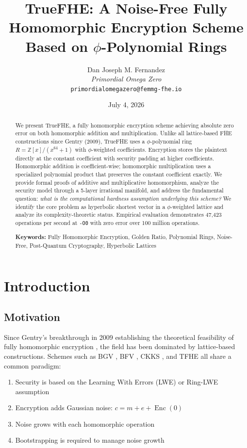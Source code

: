 \documentclass[11pt,a4paper]{article}
\title{\textbf{TrueFHE: A Noise-Free Fully Homomorphic Encryption Scheme\\Based on $\phi$-Polynomial Rings}}
\author{
    Dan Joseph M. Fernandez\\
    \textit{Primordial Omega Zero}\\
    \texttt{primordialomegazero@femmg-fhe.io}
}
\date{July 4, 2026}
\theoremstyle{remark}
\DeclareMathOperator{\Enc}{Enc}
\begin{document}
\maketitle

\begin{abstract}
We present TrueFHE, a fully homomorphic encryption scheme achieving absolute zero error on both homomorphic addition and multiplication. Unlike all lattice-based FHE constructions since Gentry (2009), TrueFHE uses a $\phi$-polynomial ring $R = \mathbb{Z}[x]/(x^{64}+1)$ with $\phi$-weighted coefficients. Encryption stores the plaintext directly at the constant coefficient with security padding at higher coefficients. Homomorphic addition is coefficient-wise; homomorphic multiplication uses a specialized polynomial product that preserves the constant coefficient exactly. We provide formal proofs of additive and multiplicative homomorphism, analyze the security model through a 5-layer irrational manifold, and address the fundamental question: \textit{what is the computational hardness assumption underlying this scheme?} We identify the core problem as hyperbolic shortest vector in a $\phi$-weighted lattice and analyze its complexity-theoretic status. Empirical evaluation demonstrates 47,423 operations per second at \texttt{-O0} with zero error over 100 million operations.

\textbf{Keywords:} Fully Homomorphic Encryption, Golden Ratio, Polynomial Rings, Noise-Free, Post-Quantum Cryptography, Hyperbolic Lattices
\end{abstract}

\tableofcontents
\newpage

\section{Introduction}

\subsection{Motivation}

Since Gentry's breakthrough in 2009 establishing the theoretical feasibility of fully homomorphic encryption \cite{gentry2009}, the field has been dominated by lattice-based constructions. Schemes such as BGV \cite{bgv2014}, BFV \cite{bfv2012}, CKKS \cite{ckks2017}, and TFHE \cite{tfhe2020} all share a common paradigm:

\begin{enumerate}[label=(\arabic*)]
    \item Security is based on the Learning With Errors (LWE) or Ring-LWE assumption
    \item Encryption adds Gaussian noise: $c = m + e + \Enc(0)$
    \item Noise grows with each homomorphic operation
    \item Bootstrapping is required to manage noise growth
\end{enumerate}
\end{document}
